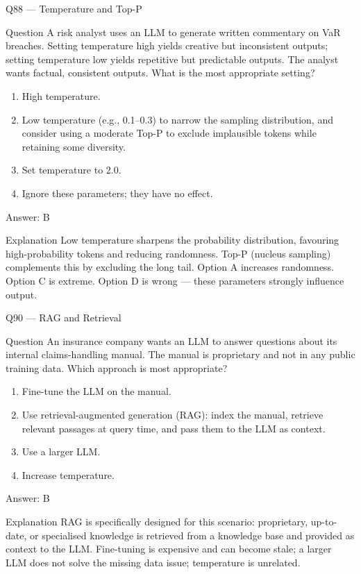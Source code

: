 \documentclass[aspectratio=169,8pt]{beamer}
\begin{document}
\begin{frame}{Q88 --- Temperature and Top-P}
\begin{block}{Question}
A risk analyst uses an LLM to generate written commentary on VaR breaches. Setting temperature high yields creative but inconsistent outputs; setting temperature low yields repetitive but predictable outputs. The analyst wants factual, consistent outputs. What is the most appropriate setting?
\end{block}
\begin{enumerate}
\item High temperature.
\item Low temperature (e.g., 0.1--0.3) to narrow the sampling distribution, and consider using a moderate Top-P to exclude implausible tokens while retaining some diversity.
\item Set temperature to 2.0.
\item Ignore these parameters; they have no effect.
\end{enumerate}
\begin{exampleblock}{Answer: B}\end{exampleblock}
\begin{block}{Explanation}
Low temperature sharpens the probability distribution, favouring high-probability tokens and reducing randomness. Top-P (nucleus sampling) complements this by excluding the long tail. Option A increases randomness. Option C is extreme. Option D is wrong --- these parameters strongly influence output.
\end{block}
\end{frame}



\begin{frame}{Q90 --- RAG and Retrieval}
\begin{block}{Question}
An insurance company wants an LLM to answer questions about its internal claims-handling manual. The manual is proprietary and not in any public training data. Which approach is most appropriate?
\end{block}
\begin{enumerate}
\item Fine-tune the LLM on the manual.
\item Use retrieval-augmented generation (RAG): index the manual, retrieve relevant passages at query time, and pass them to the LLM as context.
\item Use a larger LLM.
\item Increase temperature.
\end{enumerate}
\begin{exampleblock}{Answer: B}\end{exampleblock}
\begin{block}{Explanation}
RAG is specifically designed for this scenario: proprietary, up-to-date, or specialised knowledge is retrieved from a knowledge base and provided as context to the LLM. Fine-tuning is expensive and can become stale; a larger LLM does not solve the missing data issue; temperature is unrelated.
\end{block}
\end{frame}
\end{document}
